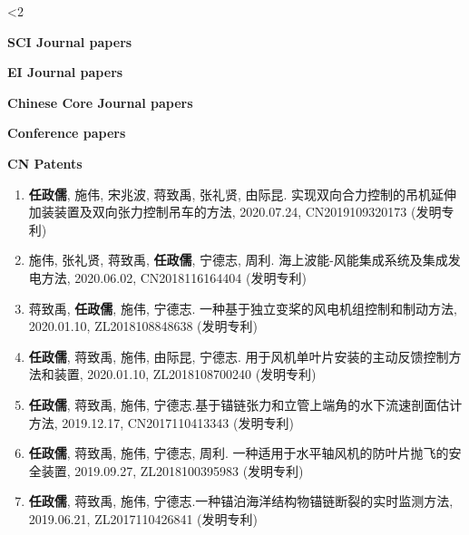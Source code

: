 \documentclass[10pt]{ctexart}
\begin{document}

\ifnum\value{num}<2 {
    
    
 
    \textbf{SCI Journal papers}
    
    \textbf{EI Journal papers}
    \vspace*{0.5em}
    
    \textbf{Chinese Core Journal papers}
    \vspace*{0.5em}
    
    \vspace*{0.5em}
    \textbf{Conference papers}
    \vspace*{0.5em}
    
   \textbf{CN Patents}
    \begin{enumerate}
    \item \textbf{任政儒}, 施伟, 宋兆波, 蒋致禹, 张礼贤, 由际昆. 实现双向合力控制的吊机延伸加装装置及双向张力控制吊车的方法, 2020.07.24, CN2019109320173 (发明专利)
    \item 施伟, 张礼贤, 蒋致禹, \textbf{任政儒}, 宁德志, 周利. 海上波能-风能集成系统及集成发电方法, 2020.06.02, CN2018116164404 (发明专利)
    \item 蒋致禹, \textbf{任政儒}, 施伟, 宁德志. 一种基于独立变桨的风电机组控制和制动方法, 2020.01.10, ZL2018108848638 (发明专利)
    \item \textbf{任政儒}, 蒋致禹, 施伟, 由际昆, 宁德志. 用于风机单叶片安装的主动反馈控制方法和装置, 2020.01.10, ZL2018108700240 (发明专利)
    \item \textbf{任政儒}, 蒋致禹, 施伟, 宁德志.基于锚链张力和立管上端角的水下流速剖面估计方法, 2019.12.17, CN2017110413343 (发明专利)
    \item \textbf{任政儒}, 蒋致禹, 施伟, 宁德志, 周利. 一种适用于水平轴风机的防叶片抛飞的安全装置, 2019.09.27, ZL2018100395983 (发明专利)
    \item \textbf{任政儒}, 蒋致禹, 施伟, 宁德志.一种锚泊海洋结构物锚链断裂的实时监测方法, 2019.06.21, ZL2017110426841 (发明专利)
    \end{enumerate}
    \vspace*{0.5em}
    
}
\end{document}
